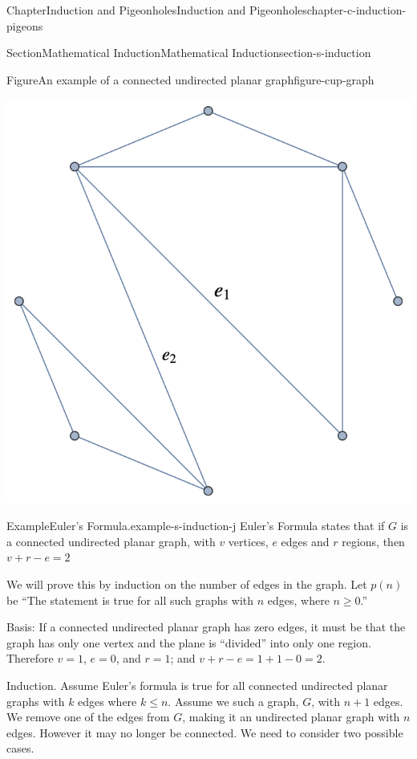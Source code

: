\documentclass[oneside,10pt,]{book}
\numberwithin{equation}{section}
\begin{document}
\begin{chapterptx}{Chapter}{Induction and Pigeonholes}{}{Induction and Pigeonholes}{}{}{chapter-c-induction-pigeons}
\begin{sectionptx}{Section}{Mathematical Induction}{}{Mathematical Induction}{}{}{section-s-induction}
\begin{figureptx}{Figure}{An example of a connected undirected planar graph}{figure-cup-graph}{}
\begin{image}{0}{1}{0}{}
\includegraphics[width=\linewidth]{images/cup-graph.png}
\end{image}%
\tcblower
\end{figureptx}%
\begin{example}{Example}{Euler's Formula.}{example-s-induction-j}%
%
Euler's Formula states that if \(G\) is a connected undirected planar graph, with \(v\) vertices, \(e\) edges and \(r\) regions, then \(v+r-e=2\)%
\par
We will prove this by induction on the number of edges in the graph.  Let \(p(n)\) be ``The statement is true for all such graphs with \(n\) edges, where \(n\geq 0\).''%
\par
Basis:  If a connected undirected planar graph has zero edges, it must be that the graph has only one vertex and the plane is  ``divided'' into only one region.  Therefore \(v=1\), \(e=0\), and \(r=1\); and   \(v+r-e=1+1-0 =2\).%
\par
Induction.  Assume Euler's formula is true for all connected undirected planar graphs  with \(k\) edges where \(k\leq n\).   Assume we such a graph, \(G\), with \(n+1\) edges.  We remove one of the edges from \(G\), making it an undirected planar graph with \(n\) edges.  However it may no longer be connected.  We need to consider two possible cases.%
\par

\end{example}
\end{sectionptx}
\end{chapterptx}
\end{document}
